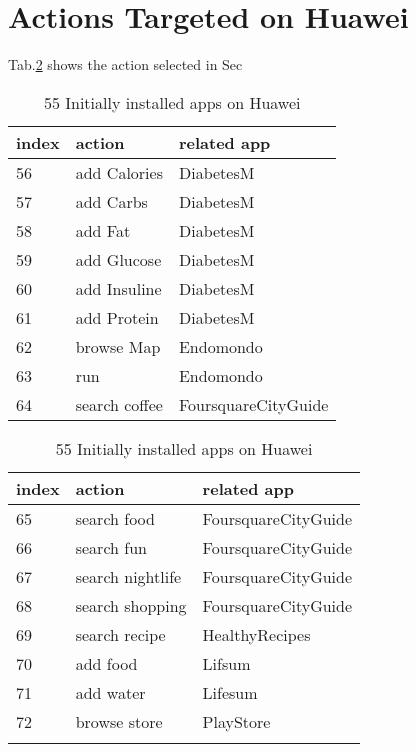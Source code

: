 \section{Actions Targeted on Huawei}
Tab.\ref{tab:selected_actions} shows the action selected in Sec
\begin{table}[ht]
\centering
\caption{55 Initially installed apps on Huawei}
    \label{tab:selected_actions}
    \begin{multicols}{2}
 \begin{tabular}{lll} 
 \toprule
 index & action & related app  \\ [0.5ex] 
 \midrule
 56 & add Calories & DiabetesM \\ 

 57 & add Carbs &  DiabetesM  \\

 58  & add Fat & DiabetesM     \\
 
 59 & add Glucose & DiabetesM    \\
 
 60 & add Insuline & DiabetesM    \\
 
 61  & add Protein & DiabetesM   \\
 
 62  & browse Map & Endomondo   \\
 
 63  & run & Endomondo   \\
 
 64 & search coffee & FoursquareCityGuide \\ 
 \bottomrule
\end{tabular}\columnbreak
\begin{center}
\begin{tabular}{lll} 
 \toprule
 index & action & related app  \\ [0.5ex] 
 \midrule
 

 65 & search food &  FoursquareCityGuide  \\

 66  & search fun & FoursquareCityGuide     \\
 
 67 & search nightlife & FoursquareCityGuide    \\
 
 68 & search shopping & FoursquareCityGuide    \\
 
 69  & search recipe & HealthyRecipes   \\
 
 70  & add food & Lifsum   \\
 
 71  & add water & Lifesum   \\
 
 72  & browse store & PlayStore   \\
 \\
 \bottomrule
\end{tabular}
\end{center}
\end{multicols}
\end{table}


